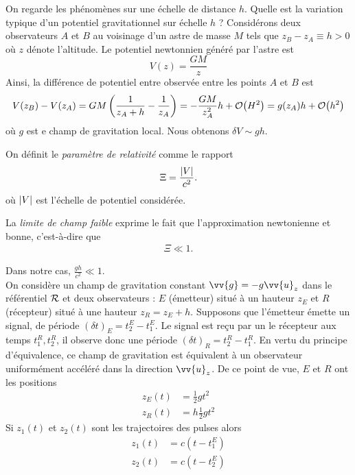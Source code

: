 \documentclass[a4paper,11pt]{report}
\begin{document}
                On regarde les phénomènes sur une échelle de distance $h$. Quelle est la variation typique d'un potentiel gravitationnel sur échelle $h$ ? Considérons deux observateurs $A$ et $B$ au voisinage d'un astre de masse $M$ tels que $z_B-z_A\equiv h>0$ où $z$ dénote l'altitude. Le potentiel newtonnien généré par l'astre est
                \begin{equation}
                    V(z) = \frac{GM}{z}
                \end{equation}
                Ainsi, la différence de potentiel entre observée entre les points $A$ et $B$ est
                \begin{equation}
                    V(z_B)-V(z_A) = GM\left( \frac{1}{z_A+h} -\frac{1}{z_A}\right)=-\frac{GM}{z^2_A}h+\order{H^2} = g(z_A)h +\order{h^2}
                \end{equation}
                où $g$ est e champ de gravitation local. Nous obtenons $\delta V\sim gh$.
                \begin{defn}
                    On définit le \textit{paramètre de relativité} comme le rapport
                    \begin{equation}
                        \Xi = \frac{\abs{V}}{c^2}.
                    \end{equation}
                    où $\abs{V}$ est l'échelle de potentiel considérée.
                \end{defn}
                \begin{defn}
                La \textit{limite de champ faible} exprime le fait que l'approximation newtonienne et bonne, c'est-à-dire que
                \begin{align}
                    \Xi\ll1.
                \end{align}
                \end{defn}
                Dans notre cas, $\frac{gh}{c^2}\ll1$.\\
            
                On considère un champ de gravitation constant $\vv{g}=-g\vv{u}_z$ dans le référentiel $\mathcal{R}$ et deux observateurs : $E$ (émetteur) situé à un hauteur $z_E$ et $R$ (récepteur) situé à une hauteur $z_R = z_E+h$. Supposons que l'émetteur émette un signal, de période $(\delta t)_E = t_2^E-t_1^E$. Le signal est reçu par un le récepteur aux temps $t_1^R,t_2^R$, il observe donc une période $(\delta t)_R = t_2^R-t_1^R$. En vertu du principe d'équivalence, ce champ de gravitation est équivalent à un observateur uniformément accéléré dans la direction $\vv{u}_z$. De ce point de vue, $E$ et $R$ ont les positions
                \begin{align}
                    z_E(t) &=  \frac{1}{2}gt^2 \\
                    z_R(t) &= h  \frac{1}{2}gt^2
                \end{align}
                Si $z_1(t)$ et $z_2(t)$ sont les trajectoires des pulses alors
                \begin{align}
                    z_1(t) &= c(t-t^E_1) \\
                    z_2(t) &= c(t-t_2^E)
                \end{align}
                
\end{document}
